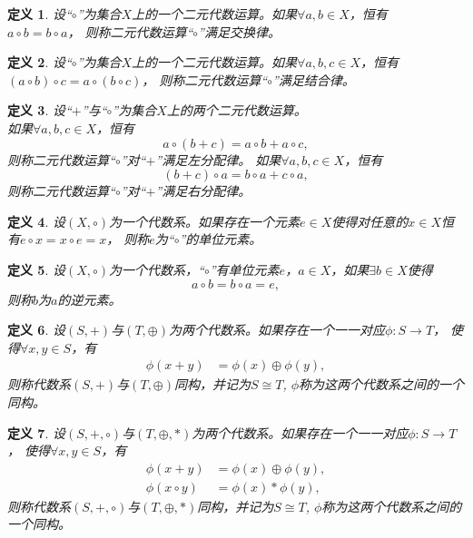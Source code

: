 \documentclass{book}[oneside]
\newtheorem{Def}{定义}[chapter]
\begin{document}
\begin{CJK*}{UTF8}{gbsn}
  \begin{Def}
    设“$\circ$”为集合$X$上的一个二元代数运算。如果$\forall a, b \in X$，恒有\\$a \circ b = b \circ a$， 则称二元代数运算“$\circ$”满足交换律。
  \end{Def}
  \begin{Def}
    设“$\circ$”为集合$X$上的一个二元代数运算。如果$\forall a, b, c \in X$，恒有$(a \circ b) \circ c = a \circ (b \circ c)$， 则称二元代数运算“$\circ$”满足结合律。
  \end{Def}
  \begin{Def}
    设“$+$”与“$\circ$”为集合$X$上的两个二元代数运算。\\如果$\forall a, b, c \in X$，恒有\[a \circ (b + c) = a \circ b + a \circ c,\] 则称二元代数运算“$\circ$”对“$+$”满足左分配律。
    如果$\forall a, b, c \in X$，恒有\[(b + c)\circ a = b \circ a + c \circ a,\] 则称二元代数运算“$\circ$”对“$+$”满足右分配律。
  \end{Def}
  \begin{Def}
    设$(X, \circ)$为一个代数系。如果存在一个元素$e\in X$使得对任意的$x\in X$恒有$e\circ x = x \circ e = x$， 则称$e$为“$\circ$”的单位元素。
  \end{Def}
  \begin{Def}
    设$(X, \circ)$为一个代数系，“$\circ$”有单位元素$e$，$a\in X$，如果$\exists b\in X$使得\[a\circ b = b \circ a = e,\]  则称$b$为$a$的逆元素。
  \end{Def}
  \begin{Def}
    设$(S,+)$与$(T, \oplus)$为两个代数系。如果存在一个一一对应$\phi:S\to T$， 使得$\forall x, y \in S$，有
    \begin{align*}
      \phi(x+y) &= \phi(x) \oplus \phi(y),
    \end{align*}
    则称代数系$(S,+)$与$(T, \oplus)$同构，并记为$S\cong T$, $\phi$称为这两个代数系之间的一个同构。
  \end{Def}
  \begin{Def}
    设$(S,+, \circ)$与$(T, \oplus, *)$为两个代数系。如果存在一个一一对应$\phi:S\to T$， 使得$\forall x, y \in S$，有
    \begin{align*}
      \phi(x+y) &= \phi(x) \oplus \phi(y),\\
      \phi(x\circ y)&= \phi(x) * \phi(y),
    \end{align*}
    则称代数系$(S,+,\circ)$与$(T, \oplus, *)$同构，并记为$S\cong T$, $\phi$称为这两个代数系之间的一个同构。
  \end{Def}
  \begin{tabular}{cc|c}

\end{tabular}
\end{CJK*}
\end{document}
